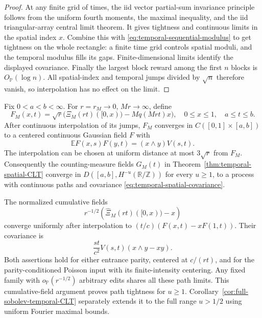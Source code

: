 \documentclass[11pt,letterpaper]{article}
\newcommand{\PP}{\mathbb P}\newcommand{\EE}{\mathbb E}
\newcommand{\T}{\mathbb R/\mathbb Z}\newcommand{\Leb}{\operatorname{Leb}}
\begin{document}
\begin{proof}
At any finite grid of times, the iid vector partial-sum
invariance principle follows from the uniform fourth moments,
the maximal inequality, and the iid triangular-array central
limit theorem. It gives tightness and continuous limits in the
spatial index $x$. Combine this with
\eqref{eq:temporal-sequential-modulus} to get tightness on the
whole rectangle: a finite time grid controls spatial moduli,
and the temporal modulus fills its gaps.
Finite-dimensional limits identify the displayed covariance.
Finally the largest block reward among the first $n$ blocks is
$O_{\PP}(\log n)$. All spatial-index and temporal jumps divided
by $\sqrt n$ therefore vanish, so interpolation has no effect
on the limit.
\end{proof}

\begin{theorem}
\label{thm:temporal-spatial-functional-CLT}
Fix $0<a<b<\infty$. For $r=r_M\to0$, $Mr\to\infty$, define
\begin{equation}\label{eq:temporal-cumulative-field}
 F_M(x,t)=\sqrt r\big(\Xi_M(rt)([0,x))
                              -Mq(Mrt)x\big),
       \quad 0\le x\le1,\quad a\le t\le b.
\end{equation}
After continuous interpolation of its jumps, $F_M$ converges
in $C([0,1]\times[a,b])$ to a centered continuous Gaussian
field $F$ with
\begin{equation}\label{eq:temporal-cumulative-covariance}
 \EE F(x,s)F(y,t)=(x\wedge y)V(s,t).
\end{equation}
The interpolation can be chosen at uniform distance at most
$3\sqrt r$ from $F_M$. Consequently the counting-measure fields
$G_M(t)$ in Theorem~\ref{thm:temporal-spatial-CLT} converge in
$D([a,b],H^{-u}(\T))$ for every $u\ge1$, to a process with
continuous paths and covariance \eqref{eq:temporal-spatial-covariance}.

The normalized cumulative fields
\[
 r^{-1/2}\left(\widehat\Xi_M(rt)([0,x))-x\right)
\]
converge uniformly after interpolation to
$(t/c)(F(x,t)-xF(1,t))$. Their covariance is
\[
 \frac{st}{c^2}V(s,t)(x\wedge y-xy).
\]
Both assertions hold for either entrance parity, centered at
$c/(rt)$, and for the parity-conditioned Poisson input with its
finite-intensity centering. Any fixed family with
$o_{\PP}(r^{-1/2})$ arbitrary edits shares all these path limits.
This cumulative-field argument proves path tightness for $u\ge1$.
Corollary~\ref{cor:full-sobolev-temporal-CLT} separately extends it
to the full range $u>1/2$ using uniform Fourier maximal bounds.
\end{theorem}
\end{document}
